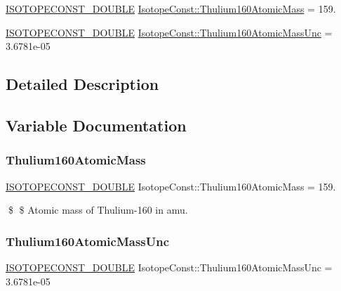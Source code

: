 \begin{DoxyCompactItemize}
\item 
\mbox{\hyperlink{group___isotope_const-_macros_ga8f45a7272ce02c0b4c65c44636ed719a}{I\+S\+O\+T\+O\+P\+E\+C\+O\+N\+S\+T\+\_\+\+D\+O\+U\+B\+LE}} \mbox{\hyperlink{group___isotope_const-_thulium-_tm160_gabd955361f7519a09ccc501d990866ffb}{Isotope\+Const\+::\+Thulium160\+Atomic\+Mass}} = 159.
\item 
\mbox{\hyperlink{group___isotope_const-_macros_ga8f45a7272ce02c0b4c65c44636ed719a}{I\+S\+O\+T\+O\+P\+E\+C\+O\+N\+S\+T\+\_\+\+D\+O\+U\+B\+LE}} \mbox{\hyperlink{group___isotope_const-_thulium-_tm160_ga2213c9d65295792e87dee0b940f8b6ea}{Isotope\+Const\+::\+Thulium160\+Atomic\+Mass\+Unc}} = 3.\+6781e-\/05
\end{DoxyCompactItemize}


\subsection{Detailed Description}


\subsection{Variable Documentation}
\mbox{\label{group___isotope_const-_thulium-_tm160_gabd955361f7519a09ccc501d990866ffb}} 
\subsubsection{\texorpdfstring{Thulium160\+Atomic\+Mass}{Thulium160AtomicMass}}
{\footnotesize\ttfamily \mbox{\hyperlink{group___isotope_const-_macros_ga8f45a7272ce02c0b4c65c44636ed719a}{I\+S\+O\+T\+O\+P\+E\+C\+O\+N\+S\+T\+\_\+\+D\+O\+U\+B\+LE}} Isotope\+Const\+::\+Thulium160\+Atomic\+Mass = 159.}

\$ \$ Atomic mass of Thulium-\/160 in amu. \mbox{\label{group___isotope_const-_thulium-_tm160_ga2213c9d65295792e87dee0b940f8b6ea}} 
\subsubsection{\texorpdfstring{Thulium160\+Atomic\+Mass\+Unc}{Thulium160AtomicMassUnc}}
{\footnotesize\ttfamily \mbox{\hyperlink{group___isotope_const-_macros_ga8f45a7272ce02c0b4c65c44636ed719a}{I\+S\+O\+T\+O\+P\+E\+C\+O\+N\+S\+T\+\_\+\+D\+O\+U\+B\+LE}} Isotope\+Const\+::\+Thulium160\+Atomic\+Mass\+Unc = 3.\+6781e-\/05}

